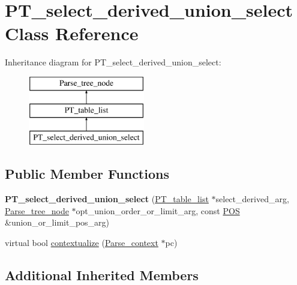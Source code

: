 \hypertarget{classPT__select__derived__union__select}{}\section{P\+T\+\_\+select\+\_\+derived\+\_\+union\+\_\+select Class Reference}
\label{classPT__select__derived__union__select}
Inheritance diagram for P\+T\+\_\+select\+\_\+derived\+\_\+union\+\_\+select\+:\begin{figure}[H]
\begin{center}
\leavevmode
\includegraphics[height=3.000000cm]{classPT__select__derived__union__select}
\end{center}
\end{figure}
\subsection*{Public Member Functions}
\begin{DoxyCompactItemize}
\item 
\mbox{\label{classPT__select__derived__union__select_a8ec477762b967a3edc2f838e957f7ec5}} 
{\bfseries P\+T\+\_\+select\+\_\+derived\+\_\+union\+\_\+select} (\mbox{\hyperlink{classPT__table__list}{P\+T\+\_\+table\+\_\+list}} $\ast$select\+\_\+derived\+\_\+arg, \mbox{\hyperlink{classParse__tree__node}{Parse\+\_\+tree\+\_\+node}} $\ast$opt\+\_\+union\+\_\+order\+\_\+or\+\_\+limit\+\_\+arg, const \mbox{\hyperlink{structYYLTYPE}{P\+OS}} \&union\+\_\+or\+\_\+limit\+\_\+pos\+\_\+arg)
\item 
virtual bool \mbox{\hyperlink{classPT__select__derived__union__select_aae12aee546f84a98e4cd95c8e98092d7}{contextualize}} (\mbox{\hyperlink{structParse__context}{Parse\+\_\+context}} $\ast$pc)
\end{DoxyCompactItemize}
\subsection*{Additional Inherited Members}


